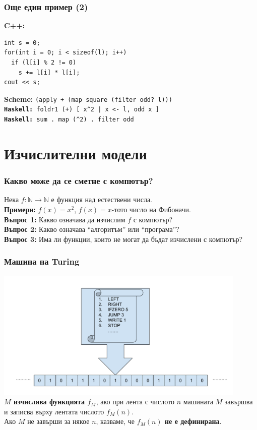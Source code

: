 \documentclass{beamer}
\begin{document}
\begin{frame}[fragile]
  \frametitle{Още един пример (2)}
  \textbf{C++:}
\begin{verbatim}
int s = 0;
for(int i = 0; i < sizeof(l); i++)
  if (l[i] % 2 != 0)
    s += l[i] * l[i];
cout << s;
\end{verbatim}
  \pause
  \textbf{Scheme:} \tt{(apply + (map square (filter odd? l)))}\\[1em]
  \pause
  \textbf{Haskell:} \tt{foldr1 (+) [ x\^{}2 | x <- l, odd x ]}\\[1em]
  \pause
  \textbf{Haskell:} \tt{sum . map (\^{}2) . filter odd}
\end{frame}

\section*{Изчислителни модели}

\begin{frame}
  \frametitle{Какво може да се сметне с компютър?}

  Нека $f:\mathbb N\to\mathbb N$ е функция над естествени числа.\\[1em]

  \textbf{Примери:} $f(x) = x^2$, $f(x) = x$-тото число на Фибоначи.\\[2em]
  \pause
  \textbf{Въпрос 1:} Какво означава да изчислим $f$ с компютър?\\[2em]
  \pause
  \textbf{Въпрос 2:} Какво означава ``алгоритъм'' или ``програма''?\\[2em]
  \pause
  \textbf{Въпрос 3:} Има ли функции, които не могат да бъдат изчислени с компютър?
\end{frame}

\begin{frame}
  \frametitle{Машина на Turing}

  \includegraphics[width=0.9\textwidth]{images/turing.pdf}\\
  \pause
  \textbf{$M$ изчислява функцията $f_M$}, ако при лента с числото $n$ машината $M$ завършва и записва върху лентата числото $f_M(n)$.\\
  \pause
  Ако $M$ не завърши за някое $n$, казваме, че \textbf{$f_M(n)$ не е дефинирана}.
\end{frame}
\end{document}
